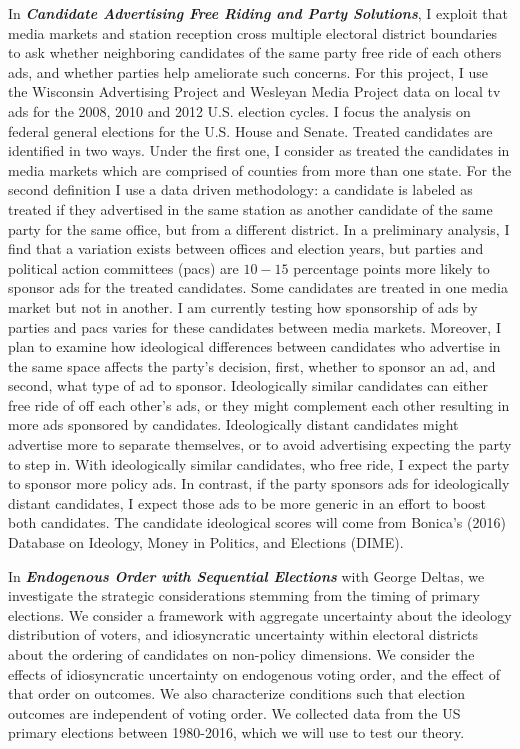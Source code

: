 \documentclass[12pt]{article}
\begin{document}
In \emph{\textbf{Candidate Advertising Free Riding and Party Solutions}},
I exploit that media markets and station reception cross multiple electoral district boundaries to ask
whether neighboring candidates of the same party free ride of each others ads,
and whether parties help ameliorate such concerns.
For this project, I use the Wisconsin Advertising Project and Wesleyan Media Project data on local tv ads for the 2008, 2010 and 2012 U.S. election cycles.
I focus the analysis on federal general elections for the U.S. House and Senate.
Treated candidates are identified in two ways.
Under the first one, I consider as treated the candidates in media markets which are comprised of counties from more than one state.
For the second definition I use a data driven methodology: a candidate is labeled as treated if they advertised in the same station as another candidate of the same party for the same office, but from a different district.
In a preliminary analysis, I find that a variation exists between offices and election years, but parties and political action committees (pacs) are \(10-15\) percentage points more likely to sponsor ads for the treated candidates.
Some candidates are treated in one media market but not in another.
I am currently testing how sponsorship of ads by parties and pacs varies for these candidates between media markets.
Moreover, I plan to examine how ideological differences between candidates who advertise in the same space affects the party's decision, first, whether to sponsor an ad, and second, what type of ad to sponsor.
Ideologically similar candidates can either free ride of off each other's ads, or they might complement each other resulting in more ads sponsored by candidates.
Ideologically distant candidates might advertise more to separate themselves, or to avoid advertising expecting the party to step in.
With ideologically similar candidates, who free ride, I expect the party to sponsor more policy ads.
In contrast, if the party sponsors ads for ideologically distant candidates, I expect those ads to be more generic in an effort to boost both candidates.
The candidate ideological scores will come from Bonica's (2016) Database on Ideology, Money in Politics, and Elections (DIME).

\vspace{0.15cm}


In \emph{\textbf{Endogenous Order with Sequential Elections}}  with George Deltas,
we investigate the strategic considerations stemming from the timing of primary elections.
We consider a framework with aggregate uncertainty about the ideology distribution of voters, and
idiosyncratic uncertainty within electoral districts about the ordering of candidates on non-policy dimensions.
We consider the effects of idiosyncratic uncertainty on endogenous voting order, and the effect of that order on outcomes.
We also characterize conditions such that election outcomes are independent of voting order.
We collected data from the US primary elections between 1980-2016, which we will use to test our theory.
\end{document}
